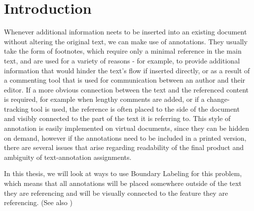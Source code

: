 \documentclass[11pt,a4paper]{vutinfth}
\begin{document}
\frontmatter
\addstatementpage






\tableofcontents

\mainmatter



\chapter{Introduction}
Whenever additional information neets to be inserted into an existing document without altering the original text, we can make use of annotations. They usually take the form of footnotes, which require only a minimal reference in the main text, and are used for a variety of reasons - for example, to provide additional information that would hinder the text's flow if inserted directly, or as a result of a commenting tool that is used for communication between an author and their editor.
If a more obvious connection between the text and the referenced content is required, for example when lengthy comments are added, or if a change-tracking tool is used, the reference is often placed to the side of the document and visibly connected to the part of the text it is referring to. This style of annotation is easily implemented on virtual documents, since they can be hidden on demand, however if the annotations need to be included in a printed version, there are several issues that arise regarding readability of the final product and ambiguity of text-annotation assignments.

In this thesis, we will look at ways to use Boundary Labeling for this problem, which means that all annotations will be placed somewhere outside of the text they are referencing and will be visually connected to the feature they are referencing. (See also \cite{Bekos2007}) 
\end{document}

